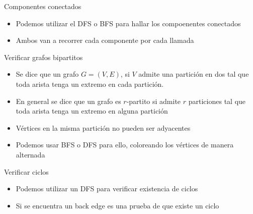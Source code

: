 \documentclass[]{beamer}
\begin{document}
\begin{frame}{Componentes conectados}
  \begin{itemize}
    \item Podemos utilizar el DFS o BFS para hallar los compoenentes conectados
      \pause
    \item Ambos van a recorrer cada componente por cada llamada
  \end{itemize}
\end{frame}

\begin{frame}{Verificar grafos bipartitos}
  \begin{itemize}
    \item Se dice que un grafo $G=(V,E)$, si $V$ admite una partici\'on en dos tal que toda arista tenga un extremo en cada partici\'on. 
      \pause
    \item En general se dice que un grafo es $r$-partito si admite $r$ particiones tal que toda arista tenga un extremo en alguna partici\'on
      \pause
    \item V\'ertices en la misma partici\'on no pueden ser adyacentes
      \pause
    \item Podemos usar BFS o DFS para ello, coloreando los v\'ertices de manera alternada
  \end{itemize}
\end{frame}

\begin{frame}{Verificar ciclos}
  \begin{itemize}
    \item Podemos utilizar un DFS para verificar existencia de ciclos
      \pause
    \item Si se encuentra un back edge es una prueba de que existe un ciclo
  \end{itemize}
\end{frame}
\end{document}

